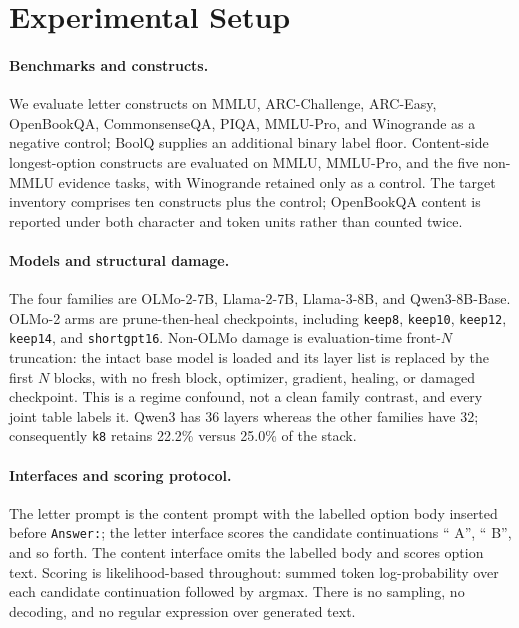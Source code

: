 \section{Experimental Setup}
\label{sec:setup}

\paragraph{Benchmarks and constructs.}
We evaluate letter constructs on MMLU, ARC-Challenge, ARC-Easy, OpenBookQA, CommonsenseQA, PIQA, MMLU-Pro, and Winogrande as a negative control; BoolQ supplies an additional binary label floor. Content-side longest-option constructs are evaluated on MMLU, MMLU-Pro, and the five non-MMLU evidence tasks, with Winogrande retained only as a control. The target inventory comprises ten constructs plus the control; OpenBookQA content is reported under both character and token units rather than counted twice.

\paragraph{Models and structural damage.}
The four families are OLMo-2-7B, Llama-2-7B, Llama-3-8B, and Qwen3-8B-Base. OLMo-2 arms are prune-then-heal checkpoints, including \texttt{keep8}, \texttt{keep10}, \texttt{keep12}, \texttt{keep14}, and \texttt{shortgpt16}. Non-OLMo damage is evaluation-time front-$N$ truncation: the intact base model is loaded and its layer list is replaced by the first $N$ blocks, with no fresh block, optimizer, gradient, healing, or damaged checkpoint. This is a regime confound, not a clean family contrast, and every joint table labels it. Qwen3 has 36 layers whereas the other families have 32; consequently \texttt{k8} retains 22.2\% versus 25.0\% of the stack.

\paragraph{Interfaces and scoring protocol.}
The letter prompt is the content prompt with the labelled option body inserted before \texttt{Answer:}; the letter interface scores the candidate continuations `` A'', `` B'', and so forth. The content interface omits the labelled body and scores option text. Scoring is likelihood-based throughout: summed token log-probability over each candidate continuation followed by argmax. There is no sampling, no decoding, and no regular expression over generated text.

